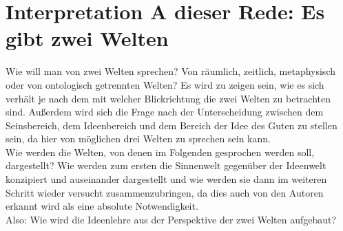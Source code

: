 \section{Interpretation A dieser Rede: Es gibt zwei Welten}
Wie will man von zwei Welten sprechen? Von räumlich, zeitlich, metaphysisch oder von ontologisch getrennten Welten? Es wird zu zeigen sein, wie es sich verhält je nach dem mit welcher Blickrichtung die zwei Welten zu betrachten sind. Außerdem wird sich die Frage nach der Unterscheidung zwischen dem Seinsbereich, dem Ideenbereich und dem Bereich der Idee des Guten zu stellen sein, da hier von möglichen drei Welten zu sprechen sein kann.\\
Wie werden die Welten, von denen im Folgenden gesprochen werden soll, dargestellt? Wie werden zum ersten die Sinnenwelt gegenüber der Ideenwelt konzipiert und auseinander dargestellt und wie werden sie dann im weiteren Schritt wieder versucht zusammenzubringen, da dies auch von den Autoren erkannt wird als eine absolute Notwendigkeit.\\

Also: Wie wird die Ideenlehre aus der Perspektive der zwei Welten aufgebaut? 


